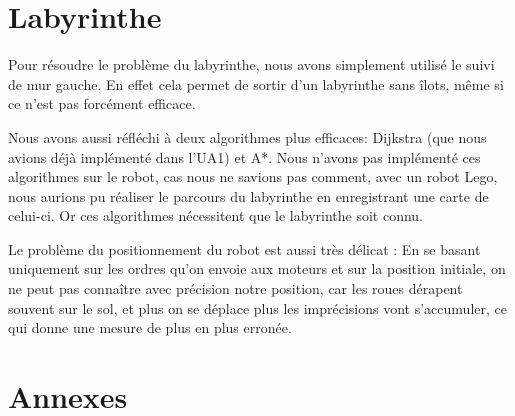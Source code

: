 \documentclass{scrartcl}
\begin{document}
\section{Labyrinthe}
  Pour résoudre le problème du labyrinthe, nous avons simplement utilisé le
  suivi de mur gauche. En effet cela permet de sortir d'un labyrinthe sans
  îlots, même si ce n'est pas forcément efficace.

  Nous avons aussi réfléchi à deux algorithmes plus efficaces: Dijkstra (que
  nous avions déjà implémenté dans l'UA1) et A*.  Nous n'avons pas implémenté
  ces algorithmes sur le robot, cas nous ne savions pas comment, avec un robot
  Lego, nous aurions pu réaliser le parcours du labyrinthe en enregistrant une
  carte de celui-ci. Or ces algorithmes nécessitent que le labyrinthe soit
  connu.

  Le problème du positionnement du robot est aussi très délicat : En se basant
  uniquement sur les ordres qu'on envoie aux moteurs et sur la position initiale,
  on ne peut pas connaître avec précision notre position, car les roues dérapent
  souvent sur le sol, et plus on se déplace plus les imprécisions vont s'accumuler,
  ce qui donne une mesure de plus en plus erronée.

\section{Annexes}
\lstlistoflistings

\end{document}
